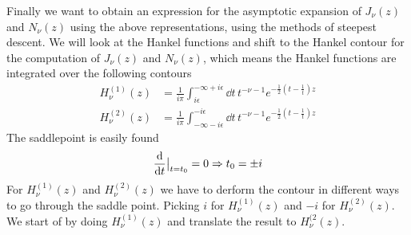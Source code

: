 \documentclass[a4paper,12pt]{article}
\begin{document}
Finally we want to obtain an expression for the asymptotic expansion of $J_\nu(z)$ and $N_\nu(z)$ using the above representations, using the methods of steepest descent. We will look at the Hankel functions and shift to the Hankel contour for the computation of $J_\nu(z)$ and $N_\nu(z)$, which means the Hankel functions are integrated over the following contours
\begin{equation}
	\begin{aligned}
		H_\nu^{(1)}(z)&=\frac{1}{i\pi }\int_{i\epsilon}^{-\infty+i\epsilon}\dd t\, t^{-\nu-1}e^{-\frac{1}{2}(t-\frac{1}{t})z}\\
		H_\nu^{(2)}(z)&=\frac{1}{i\pi }\int^{-i\epsilon}_{-\infty-i\epsilon}\dd t\, t^{-\nu-1}e^{-\frac{1}{2}(t-\frac{1}{t})z}
	\end{aligned}
\end{equation}
The saddlepoint is easily found
\begin{equation}
	\begin{aligned}
		\dv{}{t}(1-1/t)\big|_{t=t_0}=0\Rightarrow t_0=\pm i
	\end{aligned}
\end{equation}
For $H_\nu^{(1)}(z)$ and $H_\nu^{(2)}(z)$ we have to derform the contour in different ways to go through the saddle point. Picking $i$ for $H_\nu^{(1)}(z)$ and $-i$ for $H_\nu^{(2)}(z)$. We start of by doing $H_\nu^{(1)}(z)$ and translate the result to $H_\nu^{(2}(z)$. 
\end{document}
